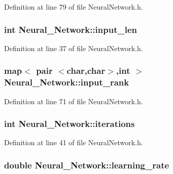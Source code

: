 Definition at line 79 of file Neural\-Network.\-h.

\hypertarget{a00003_a9e5319bf385fa55bbbd8f0160915306d}{
\subsubsection[{input\-\_\-len}]{\setlength{\rightskip}{0pt plus 5cm}int Neural\-\_\-\-Network\-::input\-\_\-len\hspace{0.3cm}{\ttfamily [private]}}}\label{d1/d7c/a00003_a9e5319bf385fa55bbbd8f0160915306d}


Definition at line 37 of file Neural\-Network.\-h.

\hypertarget{a00003_abb3f03e964a641cd94933a0f34292626}{
\subsubsection[{input\-\_\-rank}]{\setlength{\rightskip}{0pt plus 5cm}map$<$ pair $<$char,char$>$,int $>$ Neural\-\_\-\-Network\-::input\-\_\-rank\hspace{0.3cm}{\ttfamily [private]}}}\label{d1/d7c/a00003_abb3f03e964a641cd94933a0f34292626}


Definition at line 71 of file Neural\-Network.\-h.

\hypertarget{a00003_a99100a67cd1859c7a5024ba5e8d4ac66}{
\subsubsection[{iterations}]{\setlength{\rightskip}{0pt plus 5cm}int Neural\-\_\-\-Network\-::iterations\hspace{0.3cm}{\ttfamily [private]}}}\label{d1/d7c/a00003_a99100a67cd1859c7a5024ba5e8d4ac66}


Definition at line 41 of file Neural\-Network.\-h.

\hypertarget{a00003_a1994986029a1ef9d55fa4bb1b440210b}{
\subsubsection[{learning\-\_\-rate}]{\setlength{\rightskip}{0pt plus 5cm}double Neural\-\_\-\-Network\-::learning\-\_\-rate\hspace{0.3cm}{\ttfamily [private]}}}\label{d1/d7c/a00003_a1994986029a1ef9d55fa4bb1b440210b}


